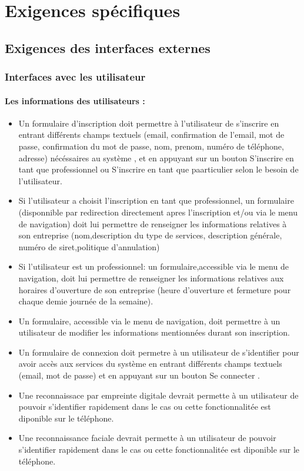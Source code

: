 \documentclass{article}
\begin{document}
\section{Exigences spécifiques}
\subsection{Exigences des interfaces externes}
\subsubsection{Interfaces avec les utilisateur}
\paragraph{Les informations des utilisateurs :}
\begin{itemize}
 \item Un formulaire d'inscription doit permettre à l'utilisateur de
   s'inscrire en entrant différents champs textuels (email,
   confirmation de l'email, mot de
   passe, confirmation du mot de passe, nom, prenom, numéro de téléphone, adresse) nécéssaires au
   système , et en appuyant sur
   un bouton \og S'inscrire en tant que professionnel\fg{} ou \og S'inscrire en tant que paarticulier\fg{} selon le besoin de l'utilisateur.

\item Si l'utilisateur a choisit l'inscription en tant que professionnel, un formulaire (disponnible par redirection 
directement apres l'inscription et/ou via le menu de navigation) doit lui permettre de renseigner les informations relatives 
à son entreprise (nom,description du type de services, description générale, numéro de siret,politique d'annulation)

\item Si l'utilisateur est un professionnel: un formulaire,accessible via le menu de navigation,  doit lui permettre de renseigner les informations relatives aux 
horaires d'ouverture de son entreprise (heure d'ouverture et fermeture pour chaque demie journée de la semaine).

\item Un formulaire, accessible via le menu de navigation, doit permettre à un utilisateur de modifier les
  informations mentionnées durant son inscription.
\item Un formulaire de connexion doit permetre à un utilisateur de
  s'identifier pour avoir accès aux services du système en entrant
  différents champs textuels (email, mot de passe) et en appuyant sur
  un bouton \og Se connecter \fg{}.

\item Une reconnaissace par empreinte digitale devrait permette à un
  utilisateur de pouvoir s'identifier rapidement dans le cas ou cette
  fonctionnalitée est diponible sur le téléphone.
\item Une reconnaissance faciale devrait permette à un
  utilisateur de pouvoir s'identifier rapidement dans le cas ou cette
  fonctionnalitée est diponible sur le téléphone.
\end{itemize}
\end{document}

